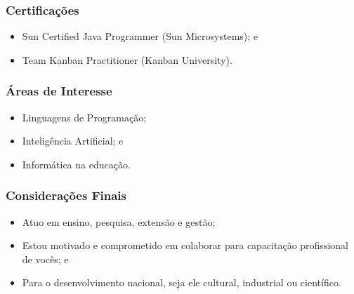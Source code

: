 \documentclass[aspectratio=169]{beamer}
\begin{document}
\begin{frame}
	\frametitle{Certifica\c cões}

	\begin{itemize}
		\item Sun Certified Java Programmer (Sun Microsystems); e
		\item Team Kanban Practitioner (Kanban University).
	\end{itemize}
\end{frame}

\begin{frame}
	\frametitle{Áreas de Interesse}
	
	\begin{itemize}
        		\item Linguagens de Programação;
		\item Inteligência Artificial; e
		\item Informática na educa\c cão.
	\end{itemize}
\end{frame}

\begin{frame}
	\frametitle{Considerações Finais}

	\begin{itemize}
		\item Atuo em ensino, pesquisa, extensão e gestão;
		\item Estou motivado e comprometido em colaborar para capacitação
		profissional de vocês; e
		\item Para o desenvolvimento nacional, seja ele cultural, industrial ou científico.
	\end{itemize}
\end{frame}
\end{document}
